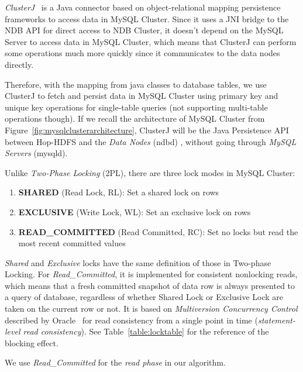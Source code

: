 \textit{ClusterJ}~\cite{mysqlclusterj} is a Java connector based on object-relational mapping persistence frameworks to access data in MySQL Cluster. Since it uses a JNI bridge to the NDB API for direct access to NDB Cluster, it doesn't depend on the MySQL Server to access data in MySQL Cluster, which means that ClusterJ can perform some operations much more quickly since it communicates to the data nodes directly. 

\noindent Therefore, with the mapping from java classes to database tables, we use ClusterJ to fetch and persist data in MySQL Cluster using primary key and unique key operations for single-table queries (not supporting multi-table operations though). If we recall the architecture of MySQL Cluster from Figure~\ref{fig:mysqlclusterarchitecture}, ClusterJ will be the Java Persistence API between Hop-HDFS and the \textit{Data Nodes} (ndbd) , without going through \textit{MySQL Servers} (mysqld).

\noindent Unlike \textit{Two-Phase Locking} (2PL), there are three lock modes in MySQL Cluster:

\begin{enumerate}[noitemsep]
	\item \textbf{SHARED} (Read Lock, RL): Set a shared lock on rows
	\item \textbf{EXCLUSIVE} (Write Lock, WL): Set an exclusive lock on rows
	\item \textbf{READ\_COMMITTED} (Read Committed, RC): Set no locks but read the most recent committed values
\end{enumerate}

\noindent \textit{Shared} and \textit{Exclusive} locks have the same definition of those in Two-phase Locking. For \textit{Read\_Committed}, it is implemented for consistent nonlocking reads, which means that a fresh committed snapshot of data row is always presented to a query of database, regardless of whether Shared Lock or Exclusive Lock are taken on the current row or not. It is based on \textit{Multiversion Concurrency Control} described by Oracle~\cite{oraclemvcc} for read consistency from a single point in time (\textit{statement-level read consistency}). See Table~\ref{table:locktable} for the reference of the blocking effect.

\noindent We use \textit{Read\_Committed} for the \textit{read phase} in our algorithm.

